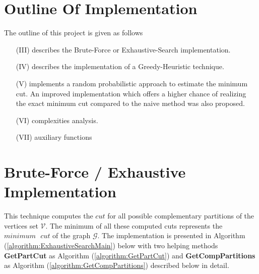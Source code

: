 \documentclass[longpaper, english, final, times]{revdetua}
\begin{document}
	\section{Outline Of Implementation}
		The outline of this project is given as follows
		\begin{enumerate}[label=(\arabic*)]
			\item[(III)] describes the Brute-Force or Exhaustive-Search implementation.
			\item[(IV)] describes the implementation of a Greedy-Heuristic technique.
			\item[(V)] implements a random probabilistic approach to estimate the minimum cut. An improved implementation which offers a higher chance of realizing the exact minimum cut compared to the naive method was also proposed.
			\item[(VI)] complexities analysis.
			\item[(VII)] auxiliary functions 
		\end{enumerate}
	 	
	 \section{Brute-Force / Exhaustive Implementation}
		This technique computes the $cut$ for all possible complementary partitions of the vertices set $\mathcal{V}$. The minimum of all these computed cuts represents the $minimum \text{ } cut$ of the graph $\mathcal{G}$. The implementation is presented in Algorithm (\ref{algorithm:ExhaustiveSearchMain}) below with two helping methods \textbf{GetPartCut} as Algorithm (\ref{algorithm:GetPartCut}) and \textbf{GetCompPartitions} as Algorithm (\ref{algorithm:GetCompPartitions}) described below in detail.
		
\end{document}
